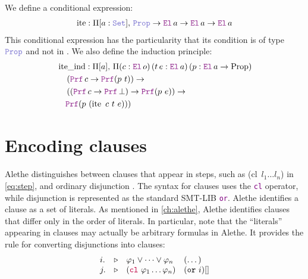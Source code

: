 \begin{definition}
We define a conditional expression:
\begin{align*}
\mathop{\mathrm{ite}} : \Pi [a: \set],\, \prop \ra \el\,a \ra \el\,a \ra \el\,a
\end{align*}
This conditional expression has the particularity that its condition is of type $\prop$ and not in \B.
We also define the induction principle:
\begin{align*}
&\mathop{\mathrm{ite\_ind}} : \Pi [a],\, \Pi (c : \el\,o)\, (t\, e : \el\,a)\, (p : \el\,a \ra \mathrm{Prop})\\
&\quad\left( \prf\,c \ra \prf(p~t) \right) \ra \\
&\quad\left( (\prf\,c \ra \prf\,\bot) \ra \prf(p~e) \right) \ra \\
&\quad\prf(p~(\mathop{\mathrm{ite}}~c~t~e)))
\end{align*}
\end{definition}

\section{Encoding clauses}

Alethe distinguishes between clauses that appear in steps, such as \colorbox{green!30}{(cl~$l_1 \dots l_n$)} in \cref{eq:step}, and ordinary disjunction \cite[\S 4]{alethespec}.
The syntax for clauses uses the \textcolor{purple}{\texttt{cl}} operator, while disjunction is represented as the standard SMT-LIB \textcolor{purple}{\texttt{or}}.
Alethe identifies a clause as a set of literals. As mentioned in \cref{ch:alethe}, Alethe identifies clauses that differ only in the order of literals. In particular, note that the ``literals'' appearing in clauses may actually be arbitrary formulas in Alethe.
It provides the  rule for converting disjunctions into clauses:
\[
\begin{matrix*}[l]
  i. & \triangleright & \varphi_1 \lor \dots \lor \varphi_n  & (\dots) \\
  j. & \triangleright & (\texttt{\textcolor{purple}{cl}}~\varphi_1 \dots \varphi_n)  & (\kw{or}~i)[] \\
\end{matrix*}
\]

